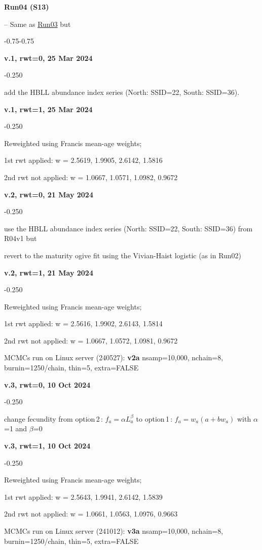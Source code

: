 \hypertarget{R04}{\textbf{Run04 (S13)}} -- Same as \hyperlink{R03}{Run03} but
\begin{itemize_csas}{-0.75}{-0.75}
	\item \textbf{v.1, rwt=0, 25 Mar 2024}
	\begin{itemize_csas}{-0.25}{0}
		\item add the HBLL abundance index series (North: SSID=22, South: SSID=36).
	\end{itemize_csas}
	\item \textbf{v.1, rwt=1, 25 Mar 2024}
	\begin{itemize_csas}{-0.25}{0}
		\item Reweighted using Francis mean-age weights;
		\item 1st rwt applied: w = 2.5619, 1.9905, 2.6142, 1.5816
		\item 2nd rwt not applied: w = 1.0667, 1.0571, 1.0982, 0.9672
	\end{itemize_csas}
	\item \textbf{v.2, rwt=0, 21 May 2024}
	\begin{itemize_csas}{-0.25}{0}
		\item use the HBLL abundance index series (North: SSID=22, South: SSID=36) from R04v1 but
		\item revert to the maturity ogive fit using the Vivian-Haist logistic (as in Run02)
	\end{itemize_csas}
	\item \textbf{v.2, rwt=1, 21 May 2024}
	\begin{itemize_csas}{-0.25}{0}
		\item Reweighted using Francis mean-age weights;
		\item 1st rwt applied: w = 2.5616, 1.9902, 2.6143, 1.5814 
		\item 2nd rwt not applied: w = 1.0667, 1.0572, 1.0981, 0.9672
		\item MCMCs run on Linux server (240527): \textbf{v2a} nsamp=10,000, nchain=8, burnin=1250/chain, thin=5, extra=FALSE
	\end{itemize_csas}
	\item \textbf{v.3, rwt=0, 10 Oct 2024}
	\begin{itemize_csas}{-0.25}{0}
		\item change fecundity from option\,2\,: $f_a = \alpha L_a^{\beta}$ to option\,1\,:  $f_a = w_a (a + b w_a)$ with $\alpha$=1 and $\beta$=0
	\end{itemize_csas}
	\item \textbf{v.3, rwt=1, 10 Oct 2024}
	\begin{itemize_csas}{-0.25}{0}
		\item Reweighted using Francis mean-age weights;
		\item 1st rwt applied: w = 2.5643, 1.9941, 2.6142, 1.5839
		\item 2nd rwt not applied: w = 1.0661, 1.0563, 1.0976, 0.9663
		\item MCMCs run on Linux server (241012): \textbf{v3a} nsamp=10,000, nchain=8, burnin=1250/chain, thin=5, extra=FALSE
	\end{itemize_csas}
\end{itemize_csas}

